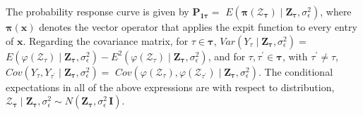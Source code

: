 

\begin{proposition}
\label{prop:meancovcondsignal}
The probability response curve is given by
$\mathbf{P}_{\mathbf{1}\boldsymbol{\tau}} =$
$E(\boldsymbol{\pi}(\boldsymbol{\mathcal{Z}}_{\boldsymbol{\tau}})
\mid \mathbf{Z}_{\boldsymbol{\tau}},\sigma_{\epsilon}^2)$, 
where $\boldsymbol{\pi}(\mathbf{x})$ denotes the vector operator that applies 
the expit function to every entry of $\mathbf{x}$. Regarding the covariance matrix, 
for $\tau\in\boldsymbol{\tau}$, 
$Var(Y_{\tau}\mid \mathbf{Z}_{\boldsymbol{\tau}},\sigma_{\epsilon}^2) =$
$E(\varphi(\mathcal{Z}_{\tau})\mid \mathbf{Z}_{\boldsymbol{\tau}},\sigma_{\epsilon}^2) - E^2(\varphi(\mathcal{Z}_{\tau})\mid \mathbf{Z}_{\boldsymbol{\tau}},\sigma_{\epsilon}^2)$, 
and for $\tau, \tau^{\prime}\in\boldsymbol{\tau}$, with $\tau^{\prime} \neq \tau$, $Cov(Y_{\tau},Y_{\tau^{\prime}}\mid\mathbf{Z}_{\boldsymbol{\tau}},\sigma_{\epsilon}^2)=$
$Cov(\varphi(\mathcal{Z}_{\tau}),\varphi(\mathcal{Z}_{\tau^{\prime}})\mid \mathbf{Z}_{\boldsymbol{\tau}},\sigma_{\epsilon}^2)$. 
The conditional expectations in all of the above expressions are with respect to distribution,
$\boldsymbol{\mathcal{Z}}_{\boldsymbol{\tau}}\mid \mathbf{Z}_{\boldsymbol{\tau}},
\sigma_{\epsilon}^2 \sim N(\mathbf{Z}_{\boldsymbol{\tau}},\sigma_{\epsilon}^2 \, \mathbf{I})$.
\end{proposition}

